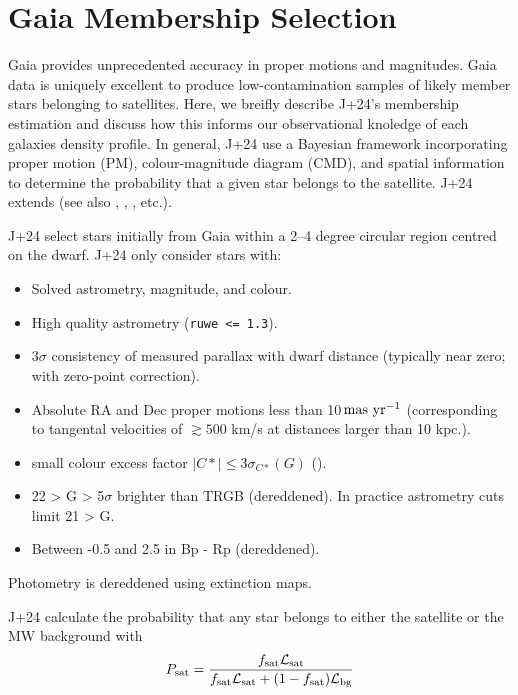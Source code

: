 \section{Gaia Membership Selection}\label{gaia-membership-selection}

Gaia provides unprecedented accuracy in proper motions and magnitudes.
Gaia data is uniquely excellent to produce low-contamination samples of
likely member stars belonging to satellites. Here, we breifly describe
J+24's membership estimation and discuss how this informs our
observational knoledge of each galaxies density profile. In general,
J+24 use a Bayesian framework incorporating proper motion (PM),
colour-magnitude diagram (CMD), and spatial information to determine the
probability that a given star belongs to the satellite. J+24 extends
\citet{MV2020a} (see also \citet{pace+li2019}, \citet{battaglia+2022},
\citet{pace+erkal+li2022}, etc.).

J+24 select stars initially from Gaia within a 2--4 degree circular
region centred on the dwarf. J+24 only consider stars with:

\begin{itemize}
\tightlist
\item
  Solved astrometry, magnitude, and colour.
\item
  High quality astrometry (\texttt{ruwe\ \textless{}=\ 1.3}).
\item
  3\(\sigma\) consistency of measured parallax with dwarf distance
  (typically near zero; with \citet{lindegren+2021} zero-point
  correction).
\item
  Absolute RA and Dec proper motions less than
  10\(\,{\rm mas\ yr^{-1}}\) (corresponding to tangental velocities of
  \(\gtrsim 500\) km/s at distances larger than 10 kpc.).
\item
  small colour excess factor \(|C*| \leq 3\sigma_{C*}(G)\)
  (\citet{riello+2021}).
\item
  22 \textgreater{} G \textgreater{} 5\(\sigma\) brighter than TRGB
  (dereddened). In practice astrometry cuts limit 21 \textgreater{} G.
\item
  Between -0.5 and 2.5 in Bp - Rp (dereddened).
\end{itemize}

Photometry is dereddened using \citet{schlegel+finkbeiner+davis1998}
extinction maps.

J+24 calculate the probability that any star belongs to either the
satellite or the MW background with \[
P_{\rm sat} = \frac{f_{\rm sat}{\cal L}_{\rm sat}}{f_{\rm sat}{\cal L}_{\rm sat} + (1-f_{\rm sat}){\cal L}_{\rm bg}}
\]


